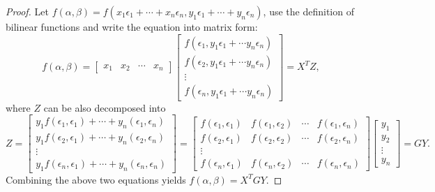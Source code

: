 \begin{proof}
  Let $f(\alpha, \beta) = f(x_1\epsilon_1 + \cdots + x_n\epsilon_n,
  y_1\epsilon_1 + \cdots + y_n\epsilon_n)$, use the definition of bilinear
  functions and write the equation into matrix form:
  \begin{equation}
    f(\alpha, \beta) =
    \left[
      \begin{array}{cccc}
        x_1&x_2&\cdots&x_n
      \end{array}
    \right] \left[
      \begin{array}{c}
        f(\epsilon_1, y_1 \epsilon_1 + \cdots y_n\epsilon_n)\\
        f(\epsilon_2, y_1 \epsilon_1 + \cdots y_n\epsilon_n)\\
        \vdots\\
        f(\epsilon_n, y_1 \epsilon_1 + \cdots y_n\epsilon_n)
      \end{array}
    \right] = X^T Z,
  \end{equation}
  where $Z$ can be also decomposed into
  \begin{equation}
    Z = \left[
      \begin{array}{c}
        y_1f(\epsilon_1,\epsilon_1) + \cdots + y_n(\epsilon_1, \epsilon_n)\\
        y_1f(\epsilon_2,\epsilon_1) + \cdots + y_n(\epsilon_2, \epsilon_n)\\
        \vdots\\
        y_1f(\epsilon_n,\epsilon_1) + \cdots + y_n(\epsilon_n, \epsilon_n)
      \end{array}
    \right] = \left[
      \begin{array}{cccc}
        f(\epsilon_1,\epsilon_1)&f(\epsilon_1,\epsilon_2)&\cdots&f(\epsilon_1, \epsilon_n)\\
        f(\epsilon_2,\epsilon_1)&f(\epsilon_2,\epsilon_2)&\cdots&f(\epsilon_2, \epsilon_n)\\
        \vdots\\
        f(\epsilon_n,\epsilon_1)&f(\epsilon_n,\epsilon_2)&\cdots&f(\epsilon_n, \epsilon_n)
      \end{array}
    \right] \left[
      \begin{array}{c}
        y_1\\
        y_2\\
        \vdots\\
        y_n
      \end{array}
    \right] = GY.
  \end{equation}
  Combining the above two equations yields $f(\alpha, \beta) = X^T GY$.
\end{proof}

